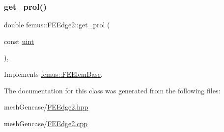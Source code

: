 \subsubsection{\texorpdfstring{get\+\_\+prol()}{get\_prol()}}
{\footnotesize\ttfamily double femus\+::\+F\+E\+Edge2\+::get\+\_\+prol (\begin{DoxyParamCaption}\item[{const \mbox{\hyperlink{_typedefs_8hpp_a91ad9478d81a7aaf2593e8d9c3d06a14}{uint}}}]{ }\end{DoxyParamCaption})\hspace{0.3cm}{\ttfamily [inline]}, {\ttfamily [virtual]}}



Implements \mbox{\hyperlink{classfemus_1_1_f_e_elem_base_ac82326cdc7cb02329c7be9547d56fad4}{femus\+::\+F\+E\+Elem\+Base}}.



The documentation for this class was generated from the following files\+:\begin{DoxyCompactItemize}
\item 
mesh\+Gencase/\mbox{\hyperlink{_f_e_edge2_8hpp}{F\+E\+Edge2.\+hpp}}\item 
mesh\+Gencase/\mbox{\hyperlink{_f_e_edge2_8cpp}{F\+E\+Edge2.\+cpp}}\end{DoxyCompactItemize}
